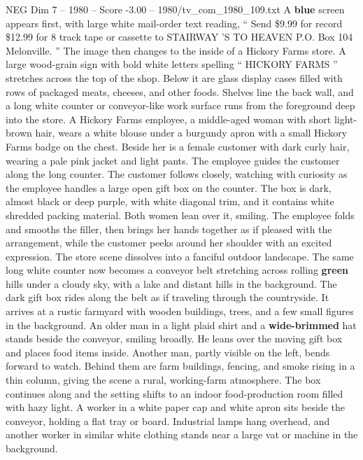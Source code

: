 \begin{textsample}{NEG Dim 7 – 1980 – Score -3.00 – 1980/tv\_com\_1980\_109.txt}  \label{ex:f7_neg_059}
A \textbf{blue} screen appears first, with large white mail-order text reading, “ Send \$9.99 for record \$12.99 for 8 track tape or cassette to STAIRWAY ’S TO HEAVEN P.O.
Box 104 Melonville. ” The image then changes to the inside of a Hickory Farms store.
A large wood-grain sign with bold white letters spelling “ HICKORY FARMS ” stretches across the top of the shop.
Below it are glass display cases filled with rows of packaged meats, cheeses, and other foods.
Shelves line the back wall, and a long white counter or conveyor-like work surface runs from the foreground deep into the store.
A Hickory Farms employee, a middle-aged woman with short light-brown hair, wears a white blouse under a burgundy apron with a small Hickory Farms badge on the chest.
Beside her is a female customer with dark curly hair, wearing a pale pink jacket and light pants.
The employee guides the customer along the long counter.
The customer follows closely, watching with curiosity as the employee handles a large open gift box on the counter.
The box is dark, almost black or deep purple, with white diagonal trim, and it contains white shredded packing material.
Both women lean over it, smiling.
The employee folds and smooths the filler, then brings her hands together as if pleased with the arrangement, while the customer peeks around her shoulder with an excited expression.
The store scene dissolves into a fanciful outdoor landscape.
The same long white counter now becomes a conveyor belt stretching across rolling \textbf{green} hills under a cloudy sky, with a lake and distant hills in the background.
The dark gift box rides along the belt as if traveling through the countryside.
It arrives at a rustic farmyard with wooden buildings, trees, and a few small figures in the background.
An older man in a light plaid shirt and a \textbf{wide-brimmed} hat stands beside the conveyor, smiling broadly.
He leans over the moving gift box and places food items inside.
Another man, partly visible on the left, bends forward to watch.
Behind them are farm buildings, fencing, and smoke rising in a thin column, giving the scene a rural, working-farm atmosphere.
The box continues along and the setting shifts to an indoor food-production room filled with hazy light.
A worker in a white paper cap and white apron sits beside the conveyor, holding a flat tray or board.
Industrial lamps hang overhead, and another worker in similar white clothing stands near a large vat or machine in the background.

\end{textsample}
